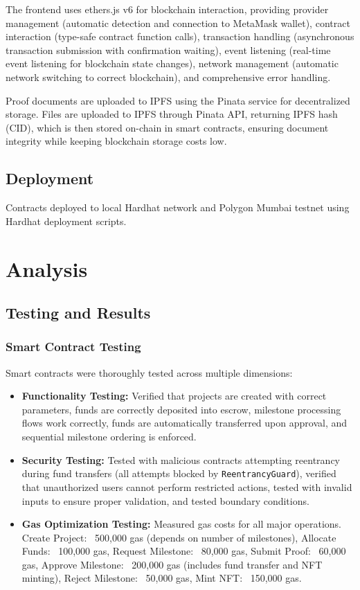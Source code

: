 \documentclass[12pt,a4wide]{report}
\theoremstyle{plain}
\theoremstyle{definition}
\theoremstyle{remark}
\begin{document}
The frontend uses ethers.js v6 \cite{ethers} for blockchain interaction, providing provider management (automatic detection and connection to MetaMask \cite{metamask} wallet), contract interaction (type-safe contract function calls), transaction handling (asynchronous transaction submission with confirmation waiting), event listening (real-time event listening for blockchain state changes), network management (automatic network switching to correct blockchain), and comprehensive error handling.

Proof documents are uploaded to IPFS \cite{ipfs} using the Pinata service for decentralized storage. Files are uploaded to IPFS through Pinata API, returning IPFS hash (CID), which is then stored on-chain in smart contracts, ensuring document integrity while keeping blockchain storage costs low.

\section{Deployment}

Contracts deployed to local Hardhat network and Polygon Mumbai testnet using Hardhat deployment scripts.

\chapter{Analysis}

\section{Testing and Results}

\subsection{Smart Contract Testing}

Smart contracts were thoroughly tested across multiple dimensions:

\begin{itemize}
    \item \textbf{Functionality Testing:} Verified that projects are created with correct parameters, funds are correctly deposited into escrow, milestone processing flows work correctly, funds are automatically transferred upon approval, and sequential milestone ordering is enforced.
    
    \item \textbf{Security Testing:} Tested with malicious contracts attempting reentrancy during fund transfers (all attempts blocked by \texttt{ReentrancyGuard}), verified that unauthorized users cannot perform restricted actions, tested with invalid inputs to ensure proper validation, and tested boundary conditions.
    
    \item \textbf{Gas Optimization Testing:} Measured gas costs for all major operations. Create Project: ~500,000 gas (depends on number of milestones), Allocate Funds: ~100,000 gas, Request Milestone: ~80,000 gas, Submit Proof: ~60,000 gas, Approve Milestone: ~200,000 gas (includes fund transfer and NFT minting), Reject Milestone: ~50,000 gas, Mint NFT: ~150,000 gas.
\end{itemize}
\end{document}
